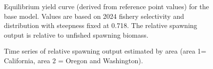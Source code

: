 \documentclass[
]{scrartcl}
\begin{document}
\begin{figure}


\caption{\label{fig-eq-yield}Equilibrium yield curve (derived from
reference point values) for the base model. Values are based on 2024
fishery selectivity and distribution with steepness fixed at 0.718. The
relative spawning output is relative to unfished spawning biomass.}

\end{figure}%

\begin{figure}


\caption{\label{fig-status-area}Time series of relative spawning output
estimated by area (area 1= California, area 2 = Oregon and Washington).}

\end{figure}%

\pagebreak



\newpage{}
\printnoidxglossaries
\end{document}
